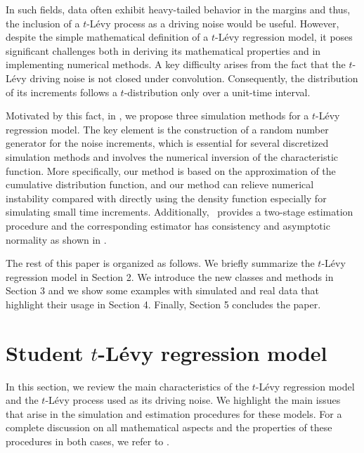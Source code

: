 In such fields, data often exhibit heavy-tailed behavior in the margins and thus, the inclusion of a \(t\)-Lévy process as a driving noise would be useful.
However, despite the simple mathematical definition of a \(t\)-Lévy regression model, it poses significant challenges both in deriving its mathematical properties and in implementing numerical methods. A key difficulty arises from the fact that the \(t\)-Lévy driving noise is not closed under convolution. Consequently, the distribution of its increments follows a \(t\)-distribution only over a unit-time interval.

Motivated by this fact, in , we propose three simulation methods for a \(t\)-Lévy regression model.
The key element is the construction of a random number generator for the noise increments, which is essential for several discretized simulation methods and involves the numerical inversion of the characteristic function.
More specifically, our method is based on the approximation of the cumulative distribution function, and our method can relieve numerical instability compared with directly using the density function especially for simulating small time increments.
Additionally, ~provides a two-stage estimation procedure and the corresponding estimator has consistency and asymptotic normality as shown in \citet{masuda2023quasilikelihood}.

The rest of this paper is organized as follows. We briefly summarize the \(t\)-Lévy regression model in Section 2. We introduce the new  classes and methods in Section 3 and we show some examples with simulated and real data that highlight their usage in Section 4. Finally, Section 5 concludes the paper.

\section{\texorpdfstring{Student \(t\)-Lévy regression model}{Student t-Lévy regression model}}\label{Math:Model}

In this section, we review the main characteristics of the \(t\)-Lévy regression model and the \(t\)-Lévy process used as its driving noise. We highlight the main issues that arise in the simulation and estimation procedures for these models. For a complete discussion on all mathematical aspects and the properties of these procedures in both cases, we refer to \citet{masuda2023quasilikelihood}.

